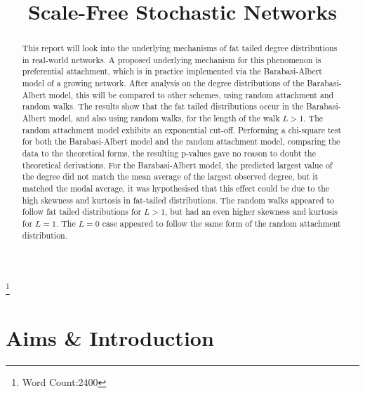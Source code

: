 \documentclass[twoside]{article}
\title{\vspace{-15mm}\fontsize{18pt}{10pt}\selectfont\textbf{Scale-Free Stochastic Networks}\vspace{-15mm}} %
\date{}
\begin{document}
\normalem
\maketitle %

\thispagestyle{fancy} %


\begin{abstract}

\noindent 
This report will look into the underlying mechanisms of fat tailed degree distributions in real-world networks. A proposed underlying mechanism for this phenomenon is preferential attachment, which is in practice implemented via the Barabasi-Albert model of a growing network. After analysis on the degree distributions of the Barabasi-Albert model, this will be compared to other schemes, using random attachment and random walks. The results show that the fat tailed distributions occur in the Barabasi-Albert model, and also using random walks, for the length of the walk $L>1$. The random attachment model exhibits an exponential cut-off. Performing a chi-square test for both the Barabasi-Albert model and the random attachment model, comparing the data to the theoretical forms, the resulting p-values gave no reason to doubt the theoretical derivations. For the Barabasi-Albert model, the predicted largest value of the degree did not match the mean average of the largest observed degree, but it matched the modal average, it was hypothesised that this effect could be due to the high skewness and kurtosis in fat-tailed distributions. The random walks appeared to follow fat tailed distributions for $L>1$, but had an even higher skewness and kurtosis for $L=1$. The $L=0$ case appeared to follow the same form of the random attachment distribution.
\end{abstract}


{\let\thefootnote\relax\footnote{Word Count:2400}}

\vspace{-5mm}
\section{Aims \& Introduction}
\end{document}
